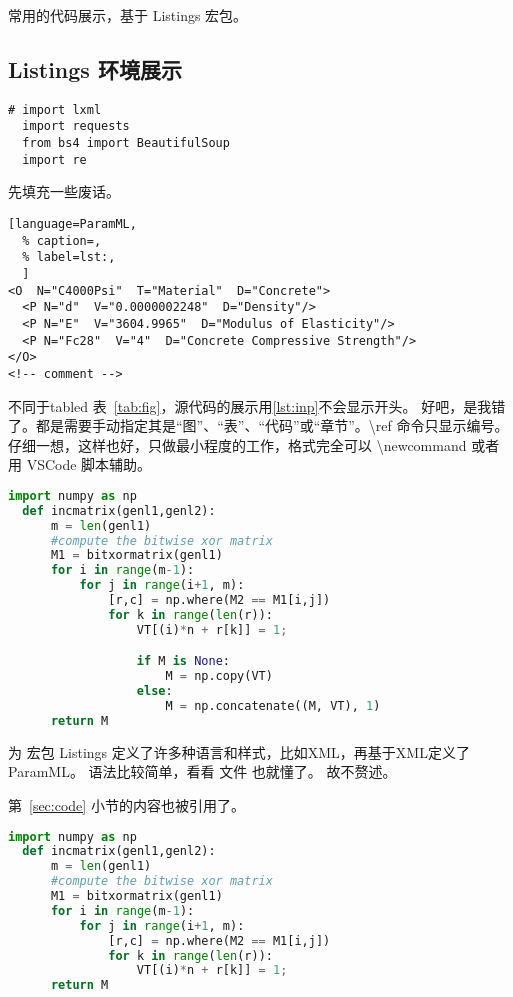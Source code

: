 \documentclass[../Main/thesis]{subfiles}
\begin{document}
常用的代码展示，基于 Listings 宏包。

\subsection{Listings 环境展示}
\label{ssc:listings}

\begin{lstlisting}[style=monocolor,
  caption={first lst env},
  label={no label},
  name=测试第一个代码,
  language=PythonPlus]
  # import lxml
  import requests
  from bs4 import BeautifulSoup
  import re
\end{lstlisting}

先填充一些废话。\zhlipsum[8]

\begin{lstlisting}[language=ParamML,
  % caption=,
  % label=lst:,
  ]
<O  N="C4000Psi"  T="Material"  D="Concrete">
  <P N="d"  V="0.0000002248"  D="Density"/>
  <P N="E"  V="3604.9965"  D="Modulus of Elasticity"/>
  <P N="Fc28"  V="4"  D="Concrete Compressive Strength"/>
</O>
<!-- comment -->
\end{lstlisting}

不同于tabled 表~\ref{tab:fig}，源代码的展示用\ref{lst:inp}不会显示开头。
好吧，是我错了。都是需要手动指定其是“图”、“表”、“代码”或“章节”。\textbackslash ref 命令只显示编号。
仔细一想，这样也好，只做最小程度的工作，格式完全可以 \textbackslash newcommand 或者用 VSCode 脚本辅助。

\begin{lstlisting}[language=Python,
  caption=Second CODE Block,
  label=lst:2nd,
  style=colored]
  import numpy as np
  def incmatrix(genl1,genl2):
      m = len(genl1)
      #compute the bitwise xor matrix
      M1 = bitxormatrix(genl1)
      for i in range(m-1):
          for j in range(i+1, m):
              [r,c] = np.where(M2 == M1[i,j])
              for k in range(len(r)):
                  VT[(i)*n + r[k]] = 1;

                  if M is None:
                      M = np.copy(VT)
                  else:
                      M = np.concatenate((M, VT), 1)
      return M
\end{lstlisting}

为 宏包 Listings 定义了许多种语言和样式，比如XML，再基于XML定义了 ParamML。
语法比较简单，看看  文件 也就懂了。
故不赘述。

第~\ref{sec:code} 小节的内容也被引用了。

\begin{lstlisting}[language=Python,
  caption=中文标题没有括号,
  label=lst:outer,
  style=colorEX]
  import numpy as np
  def incmatrix(genl1,genl2):
      m = len(genl1)
      #compute the bitwise xor matrix
      M1 = bitxormatrix(genl1)
      for i in range(m-1):
          for j in range(i+1, m):
              [r,c] = np.where(M2 == M1[i,j])
              for k in range(len(r)):
                  VT[(i)*n + r[k]] = 1;
      return M
\end{lstlisting}
\end{document}
